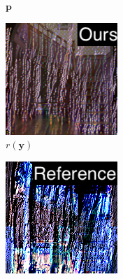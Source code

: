 \begin{figure}[]
\begin{subfigure}{\textwidth}
\begin{subfigure}{0.19\textwidth}
            \caption{\(\bm{p}\)}
            \label{fig:ex03-staircase_illum-wood-stats_im}
        \end{subfigure}
        \hfill
        \begin{subfigure}{0.19\textwidth}
            \centering
            \includegraphics[width=\textwidth]{images/04-experiment03/staircase_illum/wood/stats_proj_label.jpg}
            \caption{\(r(\bm{y})\)}
            \label{fig:ex03-staircase_illum-wood-stats_proj}
        \end{subfigure}
        \hfill
        \begin{subfigure}{0.19\textwidth}
            \centering
            \includegraphics[width=\textwidth]{images/04-experiment03/staircase_illum/wood/pixel_im_label.jpg}

\end{subfigure}
\end{subfigure}
\end{figure}
